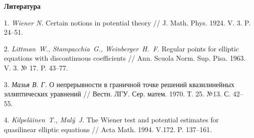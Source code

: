 \smallskip \centerline {\bf Литература} \nopagebreak

1. {\it Wiener N.} Certain notions in potential theory // J. Math. Phys. 1924. V. 3. P. 24--51.

2. {\it Littman~W., Stampacchia~G., Weinberger~H.~F.} Regular points for elliptic equations with discontinuous coefficients // Ann. Scuola Norm. Sup. Pisa. 1963. V. 3. № 17. P. 43--77.

3. {\it Мазья В. Г.} О непрерывности в граничной точке решений квазилинейных эллиптических
уравнений // Вестн. ЛГУ. Сер. матем. 1970. Т. 25. №13. С. 42--55.

4. {\it Kilpel\"ainen~T., Mal\'y~J.} The Wiener test and potential estimates for quasilinear elliptic equations // Acta Math. 1994. V.172. P. 137--161.
